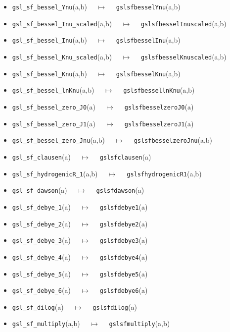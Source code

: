\documentclass[a4paper,twoside,12pt]{book}
\begin{document}
{\begin{itemize}
\item \texttt{gsl\_sf\_bessel\_Ynu}(a,b) $\quad \mapsto\quad $ \texttt{gslsfbesselYnu}(a,b) 
\item \texttt{gsl\_sf\_bessel\_Inu\_scaled}(a,b) $\quad \mapsto\quad $ \texttt{gslsfbesselInuscaled}(a,b) 
\item \texttt{gsl\_sf\_bessel\_Inu}(a,b) $\quad \mapsto\quad $ \texttt{gslsfbesselInu}(a,b) 
\item \texttt{gsl\_sf\_bessel\_Knu\_scaled}(a,b) $\quad \mapsto\quad $ \texttt{gslsfbesselKnuscaled}(a,b) 
\item \texttt{gsl\_sf\_bessel\_Knu}(a,b) $\quad \mapsto\quad $ \texttt{gslsfbesselKnu}(a,b) 
\item \texttt{gsl\_sf\_bessel\_lnKnu}(a,b) $\quad \mapsto\quad $ \texttt{gslsfbessellnKnu}(a,b) 
\item \texttt{gsl\_sf\_bessel\_zero\_J0}(a) $\quad \mapsto\quad $ \texttt{gslsfbesselzeroJ0}(a) 
\item \texttt{gsl\_sf\_bessel\_zero\_J1}(a) $\quad \mapsto\quad $ \texttt{gslsfbesselzeroJ1}(a) 
\item \texttt{gsl\_sf\_bessel\_zero\_Jnu}(a,b) $\quad \mapsto\quad $ \texttt{gslsfbesselzeroJnu}(a,b) 
\item \texttt{gsl\_sf\_clausen}(a) $\quad \mapsto\quad $ \texttt{gslsfclausen}(a) 
\item \texttt{gsl\_sf\_hydrogenicR\_1}(a,b) $\quad \mapsto\quad $ \texttt{gslsfhydrogenicR1}(a,b) 
\item \texttt{gsl\_sf\_dawson}(a) $\quad \mapsto\quad $ \texttt{gslsfdawson}(a) 
\item \texttt{gsl\_sf\_debye\_1}(a) $\quad \mapsto\quad $ \texttt{gslsfdebye1}(a) 
\item \texttt{gsl\_sf\_debye\_2}(a) $\quad \mapsto\quad $ \texttt{gslsfdebye2}(a) 
\item \texttt{gsl\_sf\_debye\_3}(a) $\quad \mapsto\quad $ \texttt{gslsfdebye3}(a) 
\item \texttt{gsl\_sf\_debye\_4}(a) $\quad \mapsto\quad $ \texttt{gslsfdebye4}(a) 
\item \texttt{gsl\_sf\_debye\_5}(a) $\quad \mapsto\quad $ \texttt{gslsfdebye5}(a) 
\item \texttt{gsl\_sf\_debye\_6}(a) $\quad \mapsto\quad $ \texttt{gslsfdebye6}(a) 
\item \texttt{gsl\_sf\_dilog}(a) $\quad \mapsto\quad $ \texttt{gslsfdilog}(a) 
\item \texttt{gsl\_sf\_multiply}(a,b) $\quad \mapsto\quad $ \texttt{gslsfmultiply}(a,b) 

\end{itemize}}
\end{document}
